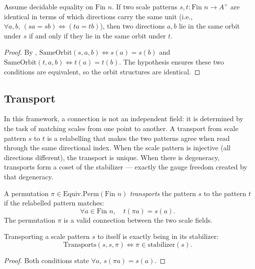 \begin{theorem}
Assume decidable equality on $\text{Fin } n$. If two scale patterns $s, t : \text{Fin } n \to A^\times$ are identical in terms of which directions carry the same unit (i.e., $\forall a, b, \, (s a = s b) \iff (t a = t b)$), then two directions $a, b$ lie in the same orbit under $s$ if and only if they lie in the same orbit under $t$.
\end{theorem}

\begin{proof}
By , $\mathrm{SameOrbit}(s, a, b) \iff s(a) = s(b)$ and $\mathrm{SameOrbit}(t, a, b) \iff t(a) = t(b)$. The hypothesis ensures these two conditions are equivalent, so the orbit structures are identical.
\end{proof}

\subsection{Transport}

In this framework, a connection is not an independent field: it is determined by the task of matching scales from one point to another. A transport from scale pattern $s$ to $t$ is a relabelling that makes the two patterns agree when read through the same directional index. When the scale pattern is injective (all directions different), the transport is unique. When there is degeneracy, transports form a coset of the stabilizer — exactly the gauge freedom created by that degeneracy.

\begin{definition}
A permutation $\pi \in \mathrm{Equiv.Perm}(\text{Fin } n)$ \emph{transports} the pattern $s$ to the pattern $t$ if the relabelled pattern matches:
\[ \forall a \in \text{Fin } n, \quad t(\pi a) = s(a). \]
The permutation $\pi$ is a valid connection between the two scale fields.
\end{definition}

\begin{theorem}
Transporting a scale pattern $s$ to itself is exactly being in its stabilizer:
\[ \mathrm{Transports}(s, s, \pi) \iff \pi \in \mathrm{stabilizer}(s). \]
\end{theorem}

\begin{proof}
Both conditions state $\forall a, \, s(\pi a) = s(a)$.
\end{proof}

